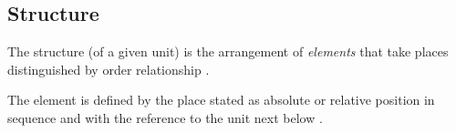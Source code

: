 \subsection{Structure}

\begin{definition}[Structure]\label{def:structure}
	The structure (of a given unit) is the arrangement of \textit{elements} that take places distinguished by order relationship \citep[p.46]{Halliday2002}. 
\end{definition}

\begin{definition}[Element]\label{def:element}
	The element is defined by the place stated as absolute or relative position in sequence and with the reference to the unit next below \citep[p.47]{Halliday2002}. 
\end{definition}



